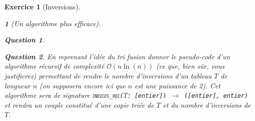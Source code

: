 \documentclass{article}
\theoremstyle{exostyle}
\newtheorem{exo}{Exercice}
\theoremstyle{partiestyle}
\newtheorem{partie}{}[exo]
\theoremstyle{questionstyle}
\newtheorem{questionpartie}{Question}[partie]
\begin{document}
\begin{exo}[Inversions]
\begin{partie}[Un algorithme plus efficace]
\begin{questionpartie}
        \end{questionpartie}
        \begin{questionpartie}
            En reprenant l'idée du tri fusion donner le pseudo-code d'un algorithme récursif de complexité $\mathcal{O}(n\ln(n))$ (ce que, bien sûr, vous justifierez) permettant de rendre le nombre d'inversions d'un tableau $T$ de longueur $n$ (on supposera encore ici que $n$ est une puissance de 2). Cet algorithme sera de signature \texttt{\textsc{indices\_rec}($T$: [entier]) $\rightarrow$ ([entier], entier)} et rendra un couple constitué d'une copie triée de $T$ et du nombre d'inversions de $T$.
        \end{questionpartie}
    \end{partie}

\newpage

\end{exo}
\end{document}
